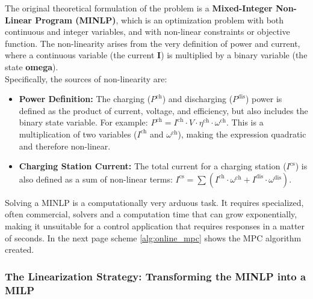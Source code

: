 The original theoretical formulation of the problem is a \textbf{Mixed-Integer Non-Linear Program (MINLP)}, which is an optimization problem with both continuous and integer variables, and with non-linear constraints or objective function. The non-linearity arises from the very definition of power and current, where a continuous variable (the current \textbf{I}) is multiplied by a binary variable (the state \textbf{omega}).
\\
\noindent
Specifically, the sources of non-linearity are:
\begin{itemize}
    \item \textbf{Power Definition:} The charging ($P^{\text{ch}}$) and discharging ($P^{\text{dis}}$) power is defined as the product of current, voltage, and efficiency, but also includes the binary state variable. For example: $P^{\text{ch}} = I^{\text{ch}} \cdot V \cdot \eta^{\text{ch}} \cdot \omega^{\text{ch}}$. This is a multiplication of two variables ($I^{\text{ch}}$ and $\omega^{\text{ch}}$), making the expression quadratic and therefore non-linear.
    \item \textbf{Charging Station Current:} The total current for a charging station ($I^{\text{cs}}$) is also defined as a sum of non-linear terms: $I^{\text{cs}} = \sum (I^{\text{ch}} \cdot \omega^{\text{ch}} + I^{\text{dis}} \cdot \omega^{\text{dis}})$.
\end{itemize}

Solving a MINLP is a computationally very arduous task. It requires specialized, often commercial, solvers and a computation time that can grow exponentially, making it unsuitable for a control application that requires responses in a matter of seconds.
In the next page scheme \ref{alg:online_mpc} shows the MPC algorithm created.  
\subsubsection{The Linearization Strategy: Transforming the MINLP into a MILP}

